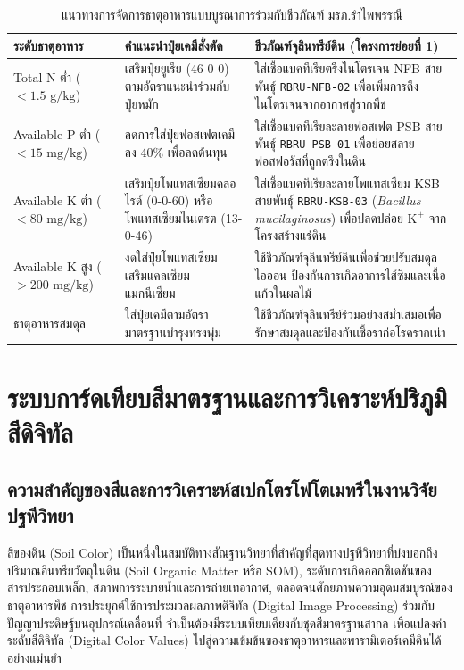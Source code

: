 \documentclass[12pt,a4paper,oneside]{book}
\begin{document}
\begin{table}[ht]
\caption{แนวทางการจัดการธาตุอาหารแบบบูรณาการร่วมกับชีวภัณฑ์ มรภ.รำไพพรรณี}\label{tab:bio_recom}
\centering
\begin{tabularx}{\textwidth}{p{3.2cm}YY}
\toprule
\textbf{ระดับธาตุอาหาร} & \textbf{คำแนะนำปุ๋ยเคมีสั่งตัด} & \textbf{ชีวภัณฑ์จุลินทรีย์ดิน (โครงการย่อยที่ 1)} \\
\midrule
Total N ต่ำ ($< 1.5\text{ g/kg}$) & เสริมปุ๋ยยูเรีย (46-0-0) ตามอัตราแนะนำร่วมกับปุ๋ยหมัก & ใส่เชื้อแบคทีเรียตรึงไนโตรเจน NFB สายพันธุ์ \texttt{RBRU-NFB-02} เพื่อเพิ่มการดึงไนโตรเจนจากอากาศสู่รากพืช \\
Available P ต่ำ ($< 15\text{ mg/kg}$) & ลดการใส่ปุ๋ยฟอสเฟตเคมีลง 40\% เพื่อลดต้นทุน & ใส่เชื้อแบคทีเรียละลายฟอสเฟต PSB สายพันธุ์ \texttt{RBRU-PSB-01} เพื่อย่อยสลายฟอสฟอรัสที่ถูกตรึงในดิน \\
Available K ต่ำ ($< 80\text{ mg/kg}$) & เสริมปุ๋ยโพแทสเซียมคลอไรด์ (0-0-60) หรือโพแทสเซียมไนเตรต (13-0-46) & ใส่เชื้อแบคทีเรียละลายโพแทสเซียม KSB สายพันธุ์ \texttt{RBRU-KSB-03} (\textit{Bacillus mucilaginosus}) เพื่อปลดปล่อย $\text{K}^+$ จากโครงสร้างแร่ดิน \\
Available K สูง ($> 200\text{ mg/kg}$) & งดใส่ปุ๋ยโพแทสเซียม เสริมแคลเซียม-แมกนีเซียม & ใช้ชีวภัณฑ์จุลินทรีย์ดินเพื่อช่วยปรับสมดุลไอออน ป้องกันการเกิดอาการไส้ซึมและเนื้อแก้วในผลไม้ \\
ธาตุอาหารสมดุล & ใส่ปุ๋ยเคมีตามอัตรามาตรฐานบำรุงทรงพุ่ม & ใช้ชีวภัณฑ์จุลินทรีย์ร่วมอย่างสม่ำเสมอเพื่อรักษาสมดุลและป้องกันเชื้อราก่อโรครากเน่า \\
\bottomrule
\end{tabularx}
\end{table}

\chapter{ระบบการ์ดเทียบสีมาตรฐานและการวิเคราะห์ปริภูมิสีดิจิทัล}

\section{ความสำคัญของสีและการวิเคราะห์สเปกโตรโฟโตเมทรีในงานวิจัยปฐพีวิทยา}
สีของดิน (Soil Color) เป็นหนึ่งในสมบัติทางสัณฐานวิทยาที่สำคัญที่สุดทางปฐพีวิทยาที่บ่งบอกถึงปริมาณอินทรียวัตถุในดิน (Soil Organic Matter หรือ SOM), ระดับการเกิดออกซิเดชันของสารประกอบเหล็ก, สภาพการระบายน้ำและการถ่ายเทอากาศ, ตลอดจนศักยภาพความอุดมสมบูรณ์ของธาตุอาหารพืช การประยุกต์ใช้การประมวลผลภาพดิจิทัล (Digital Image Processing) ร่วมกับปัญญาประดิษฐ์บนอุปกรณ์เคลื่อนที่ จำเป็นต้องมีระบบเทียบเคียงกับชุดสีมาตรฐานสากล เพื่อแปลงค่าระดับสีดิจิทัล (Digital Color Values) ไปสู่ความเข้มข้นของธาตุอาหารและพารามิเตอร์เคมีดินได้อย่างแม่นยำ
\end{document}
